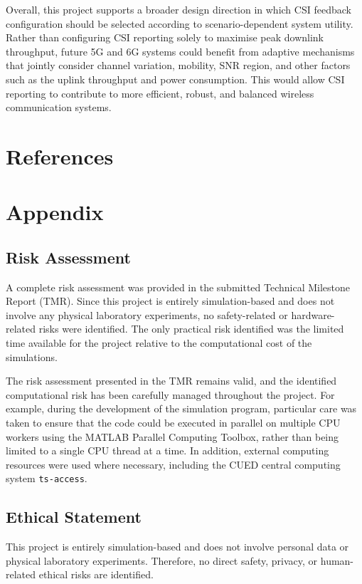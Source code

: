 \documentclass[a4paper,12pt,onecolumn]{article}
\begin{document}
	Overall, this project supports a broader design direction in which CSI feedback configuration should be selected according to scenario-dependent system utility. Rather than configuring CSI reporting solely to maximise peak downlink throughput, future 5G and 6G systems could benefit from adaptive mechanisms that jointly consider channel variation, mobility, SNR region, and other factors such as the uplink throughput and power consumption. This would allow CSI reporting to contribute to more efficient, robust, and balanced wireless communication systems.

\newpage
\section{References} \let\refname\relax
\thispagestyle{empty}
	\vspace*{-1cm}
	\begingroup
	
\endgroup

\newpage
\section{Appendix}
\thispagestyle{empty}
\subsection{Risk Assessment}
	A complete risk assessment was provided in the submitted Technical Milestone Report (TMR). Since this project is entirely simulation-based and does not involve any physical laboratory experiments, no safety-related or hardware-related risks were identified. The only practical risk identified was the limited time available for the project relative to the computational cost of the simulations.
	
	The risk assessment presented in the TMR remains valid, and the identified computational risk has been carefully managed throughout the project. For example, during the development of the simulation program, particular care was taken to ensure that the code could be executed in parallel on multiple CPU workers using the MATLAB Parallel Computing Toolbox, rather than being limited to a single CPU thread at a time. In addition, external computing resources were used where necessary, including the CUED central computing system \texttt{ts-access}.
	
\subsection{Ethical Statement}
	This project is entirely simulation-based and does not involve personal data or physical laboratory experiments. Therefore, no direct safety, privacy, or human-related ethical risks are identified. 
	
\end{document}
